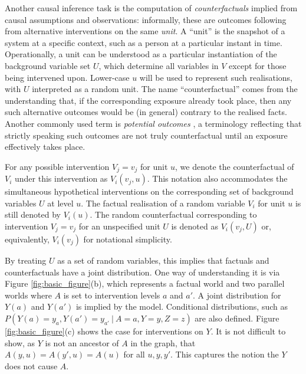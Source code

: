 \documentclass{article}
\begin{document}
Another causal inference task is the computation of
\emph{counterfactuals} implied from causal assumptions and
observations: informally, these are outcomes following from
alternative interventions on the same \emph{unit}. A ``unit'' is the
snapshot of a system at a specific context, such as a person at a
particular instant in time. Operationally, a unit can be understood as
a particular instantiation of the background variable set $U$, which
determine all variables in $V$ except for those being intervened
upon. Lower-case $u$ will be used to represent such realisations,
with $U$ interpreted as a random unit. The name
``counterfactual'' comes from the understanding that, if the
corresponding exposure already took place, then any such alternative
outcomes would be (in general) contrary to the realised facts. Another
commonly used term is \emph{potential outcomes} \cite{rubin:74}, a
terminology reflecting that strictly speaking such outcomes are not
truly counterfactual until an exposure effectively takes place.

For any possible intervention $V_j = v_j$ for unit $u$, we denote the
counterfactual of $V_i$ under this intervention as $V_i(v_j, u)$. This
notation also accommodates the simultaneous hypothetical interventions
on the corresponding set of background variables $U$ at level $u$.
The factual realisation of a random variable $V_i$ for unit $u$ is
still denoted by $V_i(u)$. The random counterfactual corresponding to
intervention $V_j = v_j$ for an unspecified unit $U$ is denoted as
$V_i(v_j, U)$ or, equivalently, $V_i(v_j)$ for notational simplicity. 

By treating $U$ as a set of random variables, this implies that
factuals and counterfactuals have a joint distribution. One way of
understanding it is via Figure \ref{fig:basic_figure}(b), which
represents a factual world and two parallel worlds where $A$ is set to
intervention levels $a$ and $a'$. A joint distribution for $Y(a)$ and $Y(a')$
is implied by the model. Conditional distributions, such as $P(Y(a) = y_a,
Y(a') = y_{a'}\ |\ A = a, Y = y, Z = z)$ are also defined. Figure \ref{fig:basic_figure}(c)
shows the case for interventions on $Y$. It is not difficult to show,
as $Y$ is not an ancestor of $A$ in the graph, that $A(y, u) = A(y', u) =
A(u)$ for all $u, y, y'$. This captures the notion the $Y$ does not cause $A$.
\end{document}
